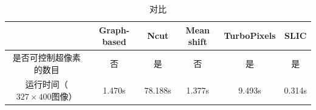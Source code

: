 \documentclass[12pt]{article}
\begin{document}
\begin{table}[!h] %
\label{tab: 1}
\centering
\begin{tabular}{|c|c|c|c|c|c|}
\hline
$\quad$ & Graph-based & Ncut & Mean shift & TurboPixels & SLIC \\
\hline
是否可控制超像素的数目 & 否 & 是 & 否 & 是 & 是\\
\hline
运行时间（$327 \times 400$图像）& 1.470s & 78.188s & 1.377s & 9.493s & 0.314s\\
\hline
\end{tabular}  
\caption{对比}
\end{table}
%




\end{document}
